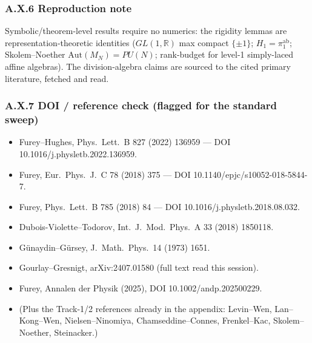 \documentclass[12pt,a4paper,twoside]{article}
\theoremstyle{plain}
\theoremstyle{definition}
\theoremstyle{remark}
\begin{document}
\subsubsection*{A.X.6 Reproduction note}

Symbolic/theorem-level results require no numerics: the rigidity lemmas are representation-theoretic identities ($GL(1,\mathbb{R})$ max compact $\{\pm1\}$; $H_1=\pi_1^{\mathrm{ab}}$; Skolem--Noether $\mathrm{Aut}(M_N)=PU(N)$; rank-budget for level-1 simply-laced affine algebras). The division-algebra claims are sourced to the cited primary literature, fetched and read.

\subsubsection*{A.X.7 DOI / reference check (flagged for the standard sweep)}

\begin{itemize}
\item Furey--Hughes, Phys.\ Lett.\ B 827 (2022) 136959 --- DOI 10.1016/j.physletb.2022.136959.
\item Furey, Eur.\ Phys.\ J.\ C 78 (2018) 375 --- DOI 10.1140/epjc/s10052-018-5844-7.
\item Furey, Phys.\ Lett.\ B 785 (2018) 84 --- DOI 10.1016/j.physletb.2018.08.032.
\item Dubois-Violette--Todorov, Int.\ J.\ Mod.\ Phys.\ A 33 (2018) 1850118.
\item G\"unaydin--G\"ursey, J.\ Math.\ Phys.\ 14 (1973) 1651.
\item Gourlay--Gresnigt, arXiv:2407.01580 (full text read this session).
\item Furey, Annalen der Physik (2025), DOI 10.1002/andp.202500229.
\item (Plus the Track-1/2 references already in the appendix: Levin--Wen, Lan--Kong--Wen, Nielsen--Ninomiya, Chamseddine--Connes, Frenkel--Kac, Skolem--Noether, Steinacker.)
\end{itemize}
\end{document}
